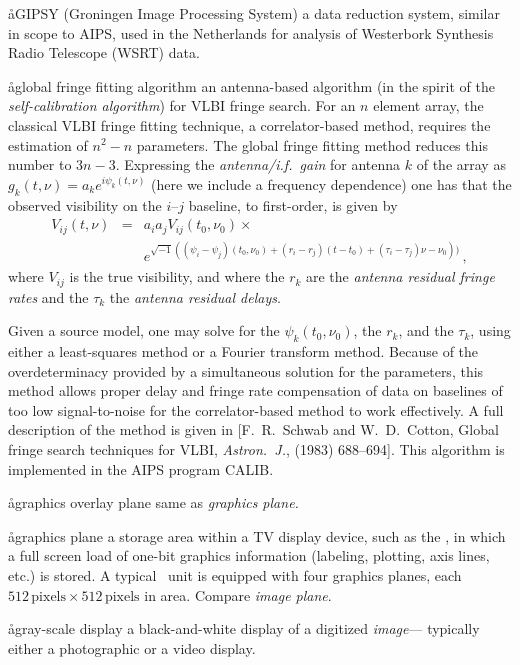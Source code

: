 \aa{GIPSY}
(Groningen Image Processing System)
a data reduction system, similar in scope to AIPS, used in the Netherlands for
analysis of Westerbork Synthesis Radio Telescope (WSRT) data.

\aa{global fringe fitting algorithm}
an antenna-based algorithm
(in the spirit of the {\it self-calibration algorithm}\/)
for VLBI fringe search.
For an $n$ element array, the classical VLBI fringe fitting technique,
a correlator-based method, requires the estimation of $n^2-n$ parameters.
The global fringe fitting method reduces this number to $3n-3$.
Expressing the {\it antenna/i.f.\ gain} for antenna $k$ of the
array as $g_k(t,\nu)=a_ke^{i\psi_k(t,\nu)}$
(here we include a frequency dependence)
one has that the observed visibility on the $i$--$j$ baseline,
to first-order, is given by
\begin{eqnarray*}
V_{ij}(t,\nu) &=&a_ia_jV_{ij}(t_0,\nu_0) \times \\
              & &e^{\sqrt{-1}((\psi_i-\psi_j)(t_0,\nu_0)+(r_i-r_j)
                 (t-t_0)+(\tau_i-\tau_j)\nu-\nu_0))} \,,
\end{eqnarray*}
where $V_{ij}$ is the true visibility,
and where the $r_k$ are the {\it antenna residual fringe rates}
and the $\tau_k$ the {\it antenna residual delays}.
\par
Given a source model, one may solve for the $\psi_k(t_0,\nu_0)$,
the $r_k$, and the $\tau_k$,
using either a least-squares method or a Fourier transform method.
Because of the overdeterminacy provided by a simultaneous
solution for the parameters,
this method allows proper delay and fringe rate compensation
of data on baselines of too low signal-to-noise
for the correlator-based method to work effectively.
A full description of the method is given in
[F.~R.~Schwab and W.~D.~Cotton, Global fringe search techniques
for VLBI, {\it Astron.~J.},  (1983) 688--694].
This algorithm is implemented in the AIPS program CALIB.

\aa{graphics overlay plane} same as {\it graphics plane.}

\aa{graphics plane}
a storage area within a TV display device, such as the \iis,
in which a full screen load of one-bit graphics information (labeling,
plotting, axis lines, etc.) is stored.
A typical \iis\ unit is equipped with four graphics planes,
each $512\,\text{pixels}\times512\,\text{pixels}$ in area.
Compare {\it image plane}.

\aa{gray-scale display}
a black-and-white display of a digitized {\it image}---%
typically either a photographic or a video display.

